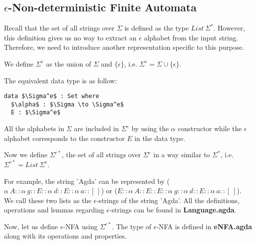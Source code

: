 \subsection{\(\epsilon\)-Non-deterministic Finite Automata}
\par Recall that the set of all strings over \(\Sigma\) is defined as
the type \(List\ \Sigma^*\). However, this definition gives us no way to
extract an \(\epsilon\) alphabet from the input string. Therefore,
we need to introduce another representation specific to this purpose. 

\begin{defn}
\noindent We define \(\Sigma^e\) as the union of
\(\Sigma\) and \(\{\epsilon\}\), i.e. \(\Sigma^e = \Sigma \cup \{\epsilon\}\).
\end{defn} 

\par The equivalent data type is as follow:
\begin{lstlisting}[mathescape=true,xleftmargin=.3\textwidth]
data $\Sigma^e$ : Set where
  $\alpha$ : $\Sigma \to \Sigma^e$
  E : $\Sigma^e$
\end{lstlisting}

\par All the alphabets in \(\Sigma\) are included in \(\Sigma^e\) by using the
\(\alpha\) constructor while the \(\epsilon\) alphabet corresponds to
the constructor \(E\) in the data type. 

\begin{defn}
\noindent Now we define \(\Sigma^{e*}\), the set of all strings over
\(\Sigma^e\) in a way similar to \(\Sigma^*\), i.e. \(\Sigma^{e*} =
List\ \Sigma^e\). 
\end{defn}

\par For example, the string 'Agda' can be
represented by (\(\alpha\ A :: \alpha\ g :: E :: \alpha\ d :: E :: \alpha\
a :: [\ ]\)) or (\(E :: \alpha\ A :: E :: E :: \alpha\ g :: \alpha\ d ::
E :: \alpha\ a :: [\ ]\)). We call these two lists as the \(\epsilon\)-strings of the
string 'Agda'. All the definitions, operations and lemmas regarding
\(\epsilon\)-strings can be found in \textbf{Language.agda}. 

\par Now, let us define \(\epsilon\)-NFA using \(\Sigma^{e*}\). The
type of \(\epsilon\)-NFA is defined in \textbf{eNFA.agda} along with its operations and
properties. 

